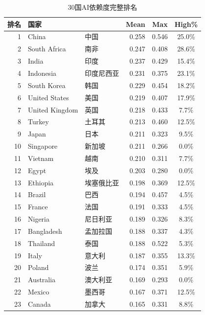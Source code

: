 \documentclass[11pt,a4paper]{article}
\begin{document}
\begin{table}[H]\centering\footnotesize
\caption{30国AI依赖度完整排名}\label{tab:rank30}
\begin{tabular}{rllrrc}
\toprule\textbf{排名} & \textbf{国家} & & \textbf{Mean} & \textbf{Max} & \textbf{High\%} \\
\midrule
1 & China & 中国           & 0.258 & 0.546 & 25.0\% \\
2 & South Africa & 南非         & 0.247 & 0.408 & 28.6\% \\
3 & India & 印度              & 0.237 & 0.429 & 15.4\% \\
4 & Indonesia & 印度尼西亚       & 0.231 & 0.375 & 23.1\% \\
5 & South Korea & 韩国          & 0.229 & 0.454 & 18.2\% \\
6 & United States & 美国        & 0.219 & 0.407 & 17.9\% \\
7 & United Kingdom & 英国       & 0.218 & 0.433 & 7.7\% \\
8 & Turkey & 土耳其            & 0.213 & 0.460 & 12.5\% \\
9 & Japan & 日本               & 0.211 & 0.323 & 9.5\% \\
10 & Singapore & 新加坡          & 0.211 & 0.266 & 0.0\% \\
11 & Vietnam & 越南              & 0.210 & 0.311 & 7.7\% \\
12 & Egypt & 埃及                & 0.203 & 0.280 & 0.0\% \\
13 & Ethiopia & 埃塞俄比亚        & 0.198 & 0.369 & 12.5\% \\
14 & Brazil & 巴西               & 0.194 & 0.457 & 4.5\% \\
15 & France & 法国                & 0.191 & 0.333 & 4.5\% \\
16 & Nigeria & 尼日利亚            & 0.189 & 0.326 & 8.3\% \\
17 & Bangladesh & 孟加拉国          & 0.188 & 0.337 & 4.3\% \\
18 & Thailand & 泰国               & 0.188 & 0.522 & 5.3\% \\
19 & Italy & 意大利                & 0.187 & 0.355 & 13.3\% \\
20 & Poland & 波兰                 & 0.174 & 0.351 & 5.9\% \\
21 & Australia & 澳大利亚           & 0.169 & 0.293 & 0.0\% \\
22 & Mexico & 墨西哥                & 0.167 & 0.371 & 12.5\% \\
23 & Canada & 加拿大                & 0.165 & 0.331 & 8.8\% \\

\end{tabular}
\end{table}
\end{document}
